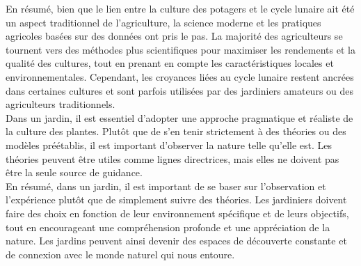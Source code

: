 En résumé, bien que le lien entre la culture des potagers et le cycle lunaire ait été un aspect traditionnel de l'agriculture, la science moderne et les pratiques agricoles basées sur des données ont pris le pas. La majorité des agriculteurs se tournent vers des méthodes plus scientifiques pour maximiser les rendements et la qualité des cultures, tout en prenant en compte les caractéristiques locales et environnementales. Cependant, les croyances liées au cycle lunaire restent ancrées dans certaines cultures et sont parfois utilisées par des jardiniers amateurs ou des agriculteurs traditionnels.\\
Dans un jardin, il est essentiel d'adopter une approche pragmatique et réaliste de la culture des plantes. Plutôt que de s'en tenir strictement à des théories ou des modèles préétablis, il est important d'observer la nature telle qu'elle est. Les théories peuvent être utiles comme lignes directrices, mais elles ne doivent pas être la seule source de guidance.\\
En résumé, dans un jardin, il est important de se baser sur l'observation et l'expérience plutôt que de simplement suivre des théories. Les jardiniers doivent faire des choix en fonction de leur environnement spécifique et de leurs objectifs, tout en encourageant une compréhension profonde et une appréciation de la nature. Les jardins peuvent ainsi devenir des espaces de découverte constante et de connexion avec le monde naturel qui nous entoure.\\



